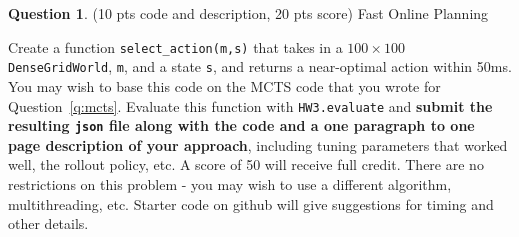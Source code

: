 \documentclass{article}
\theoremstyle{definition}
\newtheorem{question}[thm]{Question}
\begin{document}
\begin{question}
    (10 pts code and description, 20 pts score) Fast Online Planning
    
    Create a function \texttt{select\_action(m,s)} that takes in a $100 \times 100$ \texttt{DenseGridWorld}, \texttt{m}, and a state \texttt{s}, and returns a near-optimal action within 50ms. You may wish to base this code on the MCTS code that you wrote for Question~\ref{q:mcts}. Evaluate this function with \texttt{HW3.evaluate} and \textbf{submit the resulting \texttt{json} file along with the code and a one paragraph to one page description of your approach}, including tuning parameters that worked well, the rollout policy, etc. A score of 50 will receive full credit. There are no restrictions on this problem - you may wish to use a different algorithm, multithreading, etc. Starter code on github will give suggestions for timing and other details.
\end{question}
\end{document}
